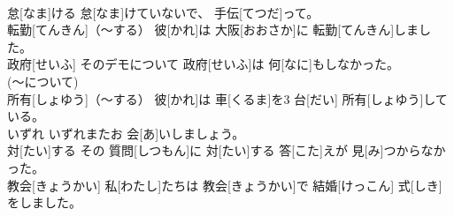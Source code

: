 \documentclass[8pt]{extreport}
\begin{document}
\begin{CJK}{UTF8}{min}
\\	怠[なま]ける	怠[なま]けていないで、 手伝[てつだ]って。		
\\	転勤[てんきん]（～する）	彼[かれ]は 大阪[おおさか]に 転勤[てんきん]しました。		
\\	政府[せいふ]	そのデモについて 政府[せいふ]は 何[なに]もしなかった。		
\\	(～について) 
\\	所有[しょゆう]（～する）	彼[かれ]は 車[くるま]を3 台[だい] 所有[しょゆう]している。		
\\	いずれ	いずれまたお 会[あ]いしましょう。		
\\	対[たい]する	その 質問[しつもん]に 対[たい]する 答[こた]えが 見[み]つからなかった。		
\\	教会[きょうかい]	私[わたし]たちは 教会[きょうかい]で 結婚[けっこん] 式[しき]をしました。		
\end{CJK}
\end{document}
